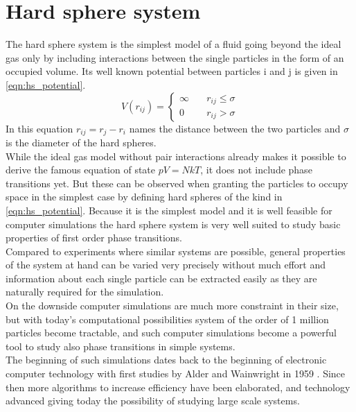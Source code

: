 
\label{chp:theory}

\section{Hard sphere system}
\label{sec:HS_system}
The hard sphere system is the simplest model of a fluid going beyond the ideal gas only by including interactions between the single particles in the form of an occupied volume. Its well known potential between particles i and j is given in \autoref{eqn:hs_potential}.
\begin{equation}
\label{eqn:hs_potential}
V(r_{ij})=%
\begin{cases}
\infty \quad & r_{ij} \le \sigma \\
0 \quad & r_{ij} > \sigma
\end{cases}
\end{equation}
In this equation $r_{ij} = r_j - r_i$ names the distance between the two particles and $\sigma$ is the diameter of the hard spheres.\\

While the ideal gas model without pair interactions already makes it possible to derive the famous equation of state $pV=NkT$, it does not include phase transitions yet. But these can be observed when granting the particles to occupy space in the simplest case by defining hard spheres of the kind in \autoref{eqn:hs_potential}. Because it is the simplest model and it is well feasible for computer simulations the hard sphere system is very well suited to study basic properties of first order phase transitions.\\ 

Compared to experiments where similar systems are possible, general properties of the system at hand can be varied very precisely without much effort and information about each single particle can be extracted easily as they are naturally required for the simulation.\\

On the downside computer simulations are much more constraint in their size, but with today's computational possibilities system of the order of 1 million particles become tractable, and such computer simulations become a powerful tool to study also phase transitions in simple systems.\\

The beginning of such simulations dates back to the beginning of electronic computer technology with first studies by Alder and Wainwright in 1959 . Since then more algorithms to increase efficiency have been elaborated, and technology advanced giving today the possibility of studying large scale systems. 

